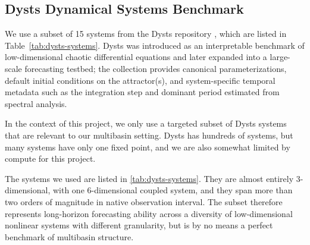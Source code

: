 \documentclass{article}
\begin{document}

\subsection{Dysts Dynamical Systems Benchmark}

We use a subset of 15 systems from the Dysts repository \citep{gilpin_chaos_2021, gilpin_model_2023}, which are listed in Table~\ref{tab:dysts-systems}. Dysts was introduced as an interpretable benchmark of low-dimensional chaotic differential equations and later expanded into a large-scale forecasting testbed; the collection provides canonical parameterizations, default initial conditions on the attractor(s), and system-specific temporal metadata such as the integration step and dominant period estimated from spectral analysis. 

In the context of this project, we only use a targeted subset of Dysts systems that are relevant to our multibasin setting. Dysts has hundreds of systems, but many systems have only one fixed point, and we are also somewhat limited by compute for this project.

The systems we used are listed in \cref{tab:dysts-systems}. They are almost entirely 3-dimensional, with one 6-dimensional coupled system, and they span more than two orders of magnitude in native observation interval. The subset therefore represents long-horizon forecasting ability across a diversity of low-dimensional nonlinear systems with different granularity, but is by no means a perfect benchmark of multibasin structure. 
\end{document}
